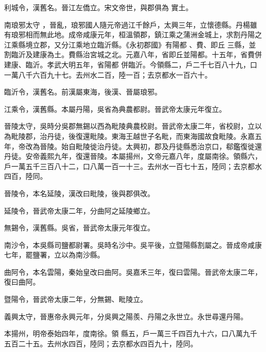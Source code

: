 \begin{pinyinscope}
 利城令，漢舊名。晉江左僑立。宋文帝世，與郡俱為
 實土。


南琅邪太守
 ，晉亂，琅邪國人隨元帝過江千餘戶，太興三年，立懷德縣。丹楊雖有琅邪相而無此地。成帝咸康元年，桓溫領郡，鎮江乘之蒲洲金城上，求割丹陽之江乘縣境立郡，又分江乘地立臨沂縣。《永初郡國》有陽都
 、費、即丘
 三縣，並割臨沂及建康為土。費縣治宮城之北。元嘉八年，省即丘並陽都。十五年，省費併建康、臨沂。孝武大明五年，省陽都
 併臨沂。今領縣二，戶二千七百八十九，口一萬八千六百九十七。去州水二百，陸一百；去京都水一百六十。



 臨沂令，漢舊名。前漢屬東海，後漢、晉屬琅邪。



 江乘令，漢舊縣。本屬丹陽，吳省為典農都尉。晉武帝太康元年復立。



 晉陵太守，吳時分吳郡無錫以西為毗陵典農校尉。晉武帝太康二年，省校尉，立以為毗陵郡，治丹徒，後復還毗陵。東海王越世子名毗，而東海國故食毗陵。永嘉五
 年，帝改為晉陵。始自毗陵徙治丹徒。太興初，郡及丹徒縣悉治京口，郗鑑復徙還丹徒。安帝義熙九年，復還晉陵。本屬揚州，文帝元嘉八年，度屬南徐。領縣六，戶一萬五千三百八十二，口八萬一百一十三。去州水一百七十五，陸同；去京都水四百，陸同。



 晉陵令，本名延陵，漢改曰毗陵，後與郡俱改。



 延陵令，晉武帝太康二年，分曲阿之延陵鄉立。



 無錫令，漢舊縣。吳省，晉武帝太康元年復立。



 南沙令，本吳縣司鹽都尉署。吳時名沙中。吳平後，立暨陽縣割屬之。晉成帝咸康七年，罷鹽署，立以為南沙縣。



 曲阿令，本名雲陽，秦始皇改曰曲阿。吳嘉禾三年，復曰雲陽。晉武帝太康二年，復曰曲阿。



 暨陽令，晉武帝太康二年，分無錫、毗陵立。



 義興太守，晉惠帝永興元年，分吳興之陽羨、丹陽之永世立。永世尋還丹陽。



 本揚州，明帝泰始四年，度南徐。領
 縣五，戶一萬三千四百九十六，口八萬九千五百二十五。去州水四百，陸同；去京都水四百九十，陸同。




\end{pinyinscope}
